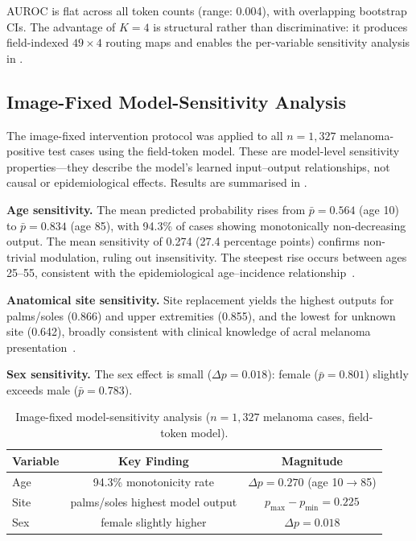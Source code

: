\documentclass[12pt, a4paper]{article}
\begin{document}
AUROC is flat across all token counts (range: 0.004), with overlapping bootstrap CIs. The advantage of $K{=}4$ is structural rather than discriminative: it produces field-indexed $49 \times 4$ routing maps and enables the per-variable sensitivity analysis in .

\subsection{Image-Fixed Model-Sensitivity Analysis}

The image-fixed intervention protocol was applied to all $n = 1{,}327$ melanoma-positive test cases using the field-token model. These are model-level sensitivity properties---they describe the model's learned input--output relationships, not causal or epidemiological effects. Results are summarised in .

\textbf{Age sensitivity.} The mean predicted probability rises from $\bar{p} = 0.564$ (age 10) to $\bar{p} = 0.834$ (age 85), with 94.3\% of cases showing monotonically non-decreasing output. The mean sensitivity of 0.274 (27.4 percentage points) confirms non-trivial modulation, ruling out insensitivity. The steepest rise occurs between ages 25--55, consistent with the epidemiological age--incidence relationship~\citep{whiteman2016growing}.

\textbf{Anatomical site sensitivity.} Site replacement yields the highest outputs for palms/soles (0.866) and upper extremities (0.855), and the lowest for unknown site (0.642), broadly consistent with clinical knowledge of acral melanoma presentation~\citep{bradford2009acral}.

\textbf{Sex sensitivity.} The sex effect is small ($\Delta p = 0.018$): female ($\bar{p} = 0.801$) slightly exceeds male ($\bar{p} = 0.783$).

\begin{table}[htbp]
\centering
\caption{Image-fixed model-sensitivity analysis ($n = 1{,}327$ melanoma cases, field-token model).}
\label{tab:counterfactual}
\begin{tabular}{lcc}
\toprule
Variable & Key Finding & Magnitude \\
\midrule
Age & 94.3\% monotonicity rate & $\Delta p = 0.270$ (age 10$\to$85) \\
Site & palms/soles highest model output & $p_{\max} - p_{\min} = 0.225$ \\
Sex & female slightly higher & $\Delta p = 0.018$ \\
\bottomrule
\end{tabular}
\end{table}
\end{document}
